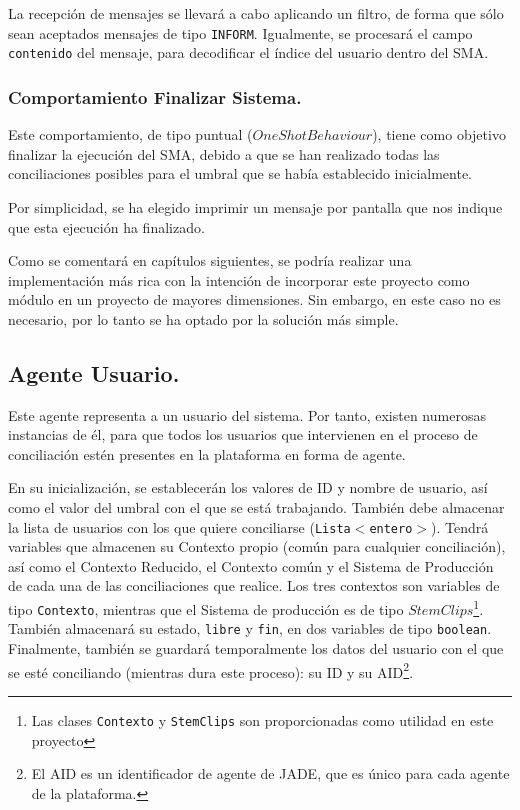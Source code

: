 La recepción de mensajes se llevará a cabo aplicando un filtro, de forma que sólo sean aceptados mensajes de tipo {\tt INFORM}. Igualmente, se procesará el campo {\tt contenido} del mensaje, para decodificar el índice del usuario dentro del SMA.

\subsubsection{Comportamiento Finalizar Sistema.}

Este comportamiento, de tipo puntual ($OneShotBehaviour$), tiene como objetivo finalizar la ejecución del SMA, debido a que se han realizado todas las conciliaciones posibles para el umbral que se había establecido inicialmente.

Por simplicidad, se ha elegido imprimir un mensaje por pantalla que nos indique que esta ejecución ha finalizado.

Como se comentará en capítulos siguientes, se podría realizar una implementación más rica con la intención de incorporar este proyecto como módulo en un proyecto de mayores dimensiones. Sin embargo, en este caso no es necesario, por lo tanto se ha optado por la solución más simple.





\subsection{Agente Usuario.}

Este agente representa a un usuario del sistema. Por tanto, existen numerosas instancias de él, para que todos los usuarios que intervienen en el proceso de conciliación estén presentes en la plataforma en forma de agente.

En su inicialización, se establecerán los valores de ID y nombre de usuario, así como el valor del umbral con el que se está trabajando. También debe almacenar la lista de usuarios con los que quiere conciliarse ({\tt Lista$<$entero$>$}). Tendrá variables que almacenen su Contexto propio (co\-mún para cualquier conciliación), así como el Contexto Reducido,  el Contexto común  y el Sistema de Producción de cada una de las conciliaciones que realice. Los tres contextos son variables de tipo {\tt Contexto}, mientras que el Sistema de producción es de tipo $StemClips$\footnote{Las clases {\tt Contexto} y {\tt StemClips} son proporcionadas como utilidad en este proyecto}. También almacenará su estado, {\tt libre} y {\tt fin}, en dos variables de tipo {\tt boolean}. Finalmente, también se guardará temporalmente los datos del usuario con el que se esté conciliando (mientras dura este proceso): su ID y su AID\footnote{El AID es un identificador de agente de JADE, que es único para cada agente de la plataforma.}.

